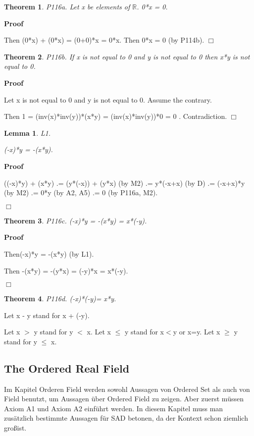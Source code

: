 \documentclass{article}
\newenvironment{forthel}{\begin{leftbar}}{\end{leftbar}}
\newenvironment{proof}{\noindent\textbf{Proof\ }}{\hspace*{\fill}$\Box$\medskip}
\newtheorem{lemma}{Lemma}
\newtheorem{theorem}{Theorem}
\begin{document}
\begin{forthel}
\begin{theorem}
 P116a.
Let x be elements of $\mathbb{R}$. 0*x = 0.\end{theorem}
\begin{proof}

Then (0*x) + (0*x)
= (0+0)*x
= 0*x.
Then 0*x = 0 (by P114b).
\end{proof}

\begin{theorem}
 P116b. 
If x is not equal to 0 and y is not equal to 0 then x*y is not equal to 0.\end{theorem}
\begin{proof}


Let x is not equal to 0 and y is not equal to 0.
Assume the contrary.

Then 1 = (inv(x)*inv(y))*(x*y)
= (inv(x)*inv(y))*0
= 0 .
Contradiction.
\end{proof}


\begin{lemma} L1.


(-x)*y = -(x*y).\end{lemma}
\begin{proof}


((-x)*y) + (x*y) .= (y*(-x)) + (y*x) (by M2)
.= y*(-x+x) (by D) 
.= (-x+x)*y (by M2)
.= 0*y (by A2, A5)
.= 0 (by P116a, M2).

\end{proof}
 
\begin{theorem}
 P116c.
(-x)*y = -(x*y) = x*(-y).\end{theorem}
\begin{proof}

Then(-x)*y = -(x*y) (by L1).

Then -(x*y) = -(y*x) = (-y)*x = x*(-y).

\end{proof}
 

\begin{theorem}
 P116d.
(-x)*(-y)= x*y.\end{theorem}


Let x - y stand for x + (-y).


Let x $>$ y stand for y $<$ x.
Let x $\leq$ y stand for x$<$y or x=y.
Let x $\geq$ y stand for y $\leq$ x.



\end{forthel}

\subsection{The Ordered Real Field}
Im Kapitel Orderen Field werden sowohl Aussagen von Ordered Set als auch von Field benutzt, um Aussagen \"uber Ordered Field zu zeigen.
Aber zuerst m\"ussen Axiom A1 und Axiom A2 einf\"uhrt werden.
In diesem Kapitel muss man zus\"atzlich bestimmte Aussagen f\"ur SAD betonen, da der Kontext schon ziemlich gro\ss \enspace ist.
\end{document}
